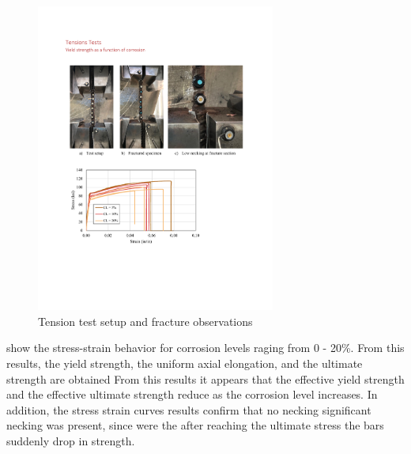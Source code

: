 \begin{figure}[htbp]
	\centering
	\includegraphics[width=0.7\textwidth]{VAC Thesis 2.0/Chapter-4/figs/TensionTest_images.pdf}
	\caption{Tension test setup and fracture observations}
	\label{fig:TensionTest_NoNecking}
\end{figure}

 show the stress-strain behavior for corrosion levels raging from 0 - 20\%. From this results, the yield strength, the uniform axial elongation, and the ultimate strength are obtained From this results it appears that the effective yield strength and the effective ultimate strength reduce as the corrosion level increases. In addition, the stress strain curves  results confirm that no necking significant necking was present, since were the after reaching the ultimate stress the bars suddenly drop  in strength. 

